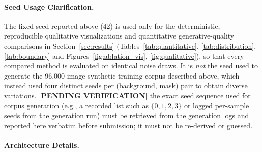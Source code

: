 \documentclass[journal]{IEEEtran}
\begin{document}
\paragraph{Seed Usage Clarification.}
The fixed seed reported above (42) is used only for the deterministic,
reproducible qualitative visualizations and quantitative generative-quality
comparisons in Section~\ref{sec:results} (Tables~\ref{tab:quantitative},
\ref{tab:distribution}, \ref{tab:boundary} and Figures~\ref{fig:ablation_vis},
\ref{fig:qualitative}), so that every compared method is evaluated on
identical noise draws. It is \emph{not} the seed used to generate the
96{,}000-image synthetic training corpus described above, which instead
used four distinct seeds per (background, mask) pair to obtain diverse
variations. \textbf{[PENDING VERIFICATION]} the exact seed sequence used for
corpus generation (e.g., a recorded list such as
$\{0,1,2,3\}$ or logged per-sample seeds from the generation run) must be
retrieved from the generation logs and reported here verbatim before
submission; it must not be re-derived or guessed.

\paragraph{Architecture Details.}
\begin{table}[H]
\centering
\caption{U-Net architecture details.}
\label{tab:unet}
\end{table}
\end{document}

